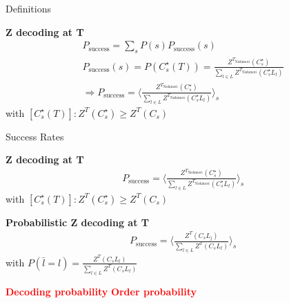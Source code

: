 \documentclass{dfki}
\begin{document}
\begin{frame}{Definitions}
	\begin{minipage}{0.48\textwidth}
		\small
		\textbf{Z decoding at T}
		\begin{align*}
			&P_{\text{success}}=\sum_{s}P(s)P_{\text{success}}(s)\\
			&P_{\text{success}}(s)=P(C^{\star}_{s}(T))=\frac{Z^{T_{\text{Nishimori}}}(C^{\star}_{s})}{\sum_{l\in L}Z^{T_{\text{Nishimori}}}(C^{\star}_{s}L_{l})}\\
			&\Rightarrow P_{\text{success}}=\langle\frac{Z^{T_{\text{Nishimori}}}(C^{\star}_{s})}{\sum_{l\in L}Z^{T_{\text{Nishimori}}}(C^{\star}_{s}L_{l})}\rangle_{s}
		\end{align*}
		with $[C^{\star}_{s}(T)]: Z^{T}(C^{\star}_{s})\geq Z^{T}(C_{s})$
    \end{minipage}
\end{frame}

\begin{frame}{Success Rates}
	\begin{minipage}{0.48\textwidth}
		\small
		\textbf{Z decoding at T}
		\begin{align*}
			&P_{\text{success}}=\langle\frac{Z^{T_{\text{Nishimori}}}(C^{\star}_{s})}{\sum_{l\in L}Z^{T_{\text{Nishimori}}}(C^{\star}_{s}L_{l})}\rangle_{s}
		\end{align*}
		with $[C^{\star}_{s}(T)]: Z^{T}(C^{\star}_{s})\geq Z^{T}(C_{s})$
    \end{minipage}
    \hfill
	\pause
    \begin{minipage}{0.48\textwidth}
        \small
		\textbf{Probabilistic Z decoding at T}
		\begin{align*}
			&P_{\text{success}}=\langle\frac{Z^{T}(C_{s}L_{\bar{l}})}{\sum_{l\in L}Z^{T}(C_{s}L_{l})}\rangle_{s}
		\end{align*}
		with $P(\bar{l}=l)=\frac{Z^{T}(C_{s}L_{l})}{\sum_{l\in L}Z^{T}(C_{s}L_{l})}$
    \end{minipage}
	\pause
	\textcolor{red}{\textbf{Decoding probability}}
	\hspace{3cm}
	\textcolor{red}{\textbf{Order probability}}
\end{frame}
\end{document}
